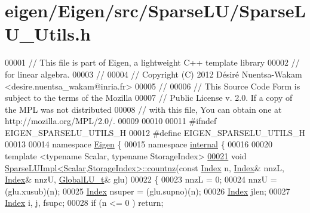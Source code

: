 \hypertarget{eigen_2_eigen_2src_2_sparse_l_u_2_sparse_l_u___utils_8h_source}{}\section{eigen/\+Eigen/src/\+Sparse\+L\+U/\+Sparse\+L\+U\+\_\+\+Utils.h}
\label{eigen_2_eigen_2src_2_sparse_l_u_2_sparse_l_u___utils_8h_source}

\begin{DoxyCode}
00001 \textcolor{comment}{// This file is part of Eigen, a lightweight C++ template library}
00002 \textcolor{comment}{// for linear algebra.}
00003 \textcolor{comment}{//}
00004 \textcolor{comment}{// Copyright (C) 2012 Désiré Nuentsa-Wakam <desire.nuentsa\_wakam@inria.fr>}
00005 \textcolor{comment}{//}
00006 \textcolor{comment}{// This Source Code Form is subject to the terms of the Mozilla}
00007 \textcolor{comment}{// Public License v. 2.0. If a copy of the MPL was not distributed}
00008 \textcolor{comment}{// with this file, You can obtain one at http://mozilla.org/MPL/2.0/.}
00009 
00010 
00011 \textcolor{preprocessor}{#ifndef EIGEN\_SPARSELU\_UTILS\_H}
00012 \textcolor{preprocessor}{#define EIGEN\_SPARSELU\_UTILS\_H}
00013 
00014 \textcolor{keyword}{namespace }\hyperlink{namespace_eigen}{Eigen} \{
00015 \textcolor{keyword}{namespace }\hyperlink{namespaceinternal}{internal} \{
00016 
00020 \textcolor{keyword}{template} <\textcolor{keyword}{typename} Scalar, \textcolor{keyword}{typename} StorageIndex>
\hyperlink{group___sparse_l_u___module_acbede3f259186d48ad42ca093f80b64b}{00021} \textcolor{keywordtype}{void} \hyperlink{group___sparse_l_u___module_acbede3f259186d48ad42ca093f80b64b}{SparseLUImpl<Scalar,StorageIndex>::countnz}(\textcolor{keyword}{const} 
      \hyperlink{namespace_eigen_a62e77e0933482dafde8fe197d9a2cfde}{Index} n, \hyperlink{namespace_eigen_a62e77e0933482dafde8fe197d9a2cfde}{Index}& nnzL, \hyperlink{namespace_eigen_a62e77e0933482dafde8fe197d9a2cfde}{Index}& nnzU, \hyperlink{struct_eigen_1_1internal_1_1_l_u___global_l_u__t}{GlobalLU\_t}& glu)
00022 \{
00023  nnzL = 0; 
00024  nnzU = (glu.xusub)(n); 
00025  \hyperlink{namespace_eigen_a62e77e0933482dafde8fe197d9a2cfde}{Index} nsuper = (glu.supno)(n); 
00026  \hyperlink{namespace_eigen_a62e77e0933482dafde8fe197d9a2cfde}{Index} jlen; 
00027  \hyperlink{namespace_eigen_a62e77e0933482dafde8fe197d9a2cfde}{Index} i, j, fsupc;
00028  \textcolor{keywordflow}{if} (n <= 0 ) \textcolor{keywordflow}{return}; 

\end{DoxyCode}
